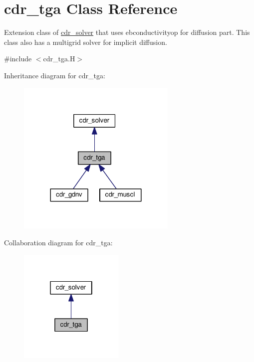 \hypertarget{classcdr__tga}{}\section{cdr\+\_\+tga Class Reference}
\label{classcdr__tga}


Extension class of \hyperlink{classcdr__solver}{cdr\+\_\+solver} that uses ebconductivityop for diffusion part. This class also has a multigrid solver for implicit diffusion.  




{\ttfamily \#include $<$cdr\+\_\+tga.\+H$>$}



Inheritance diagram for cdr\+\_\+tga\+:\nopagebreak
\begin{figure}[H]
\begin{center}
\leavevmode
\includegraphics[width=216pt]{classcdr__tga__inherit__graph}
\end{center}
\end{figure}


Collaboration diagram for cdr\+\_\+tga\+:\nopagebreak
\begin{figure}[H]
\begin{center}
\leavevmode
\includegraphics[width=142pt]{classcdr__tga__coll__graph}
\end{center}
\end{figure}
